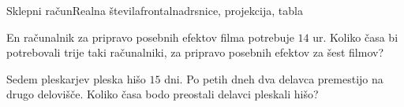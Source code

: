 \begin{priprava}{18}{}{Sklepni račun}{Realna števila}{frontalna}{drsnice, projekcija, tabla}
        \begin{naloga}
            En računalnik za pripravo posebnih efektov filma potrebuje $14$ ur.
            Koliko časa bi potrebovali trije taki računalniki, za pripravo posebnih efektov za šest filmov?            
        \end{naloga}

        \begin{naloga}
            Sedem pleskarjev pleska hišo $15$ dni. Po petih dneh dva delavca premestijo na drugo delovišče.
            Koliko časa bodo preostali delavci pleskali hišo?            
        \end{naloga}

    

    
\end{priprava}